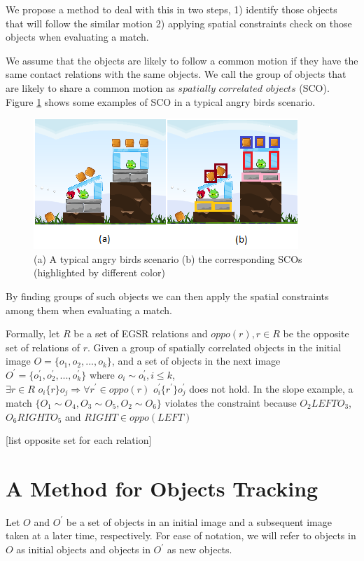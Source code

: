 \documentclass[letterpaper]{article}
\begin{document}
We propose a method to deal with this in two steps, 1) identify those objects that will follow the similar motion 2) applying spatial constraints check on those objects when evaluating a match. 


We assume that the objects are likely to follow a common motion if they have the same contact relations with the same objects. We call the group of objects that are likely to share a common motion as $spatially\,\,correlated\,\,objects$ (SCO). Figure \ref{SCOExample} shows some examples of SCO in a typical angry birds scenario. 
\begin{figure}[h!]\label{SCOExample}
\centering\includegraphics[scale=0.7]{SCOScenario.png}\caption{(a) A typical angry birds scenario (b) the corresponding SCOs (highlighted by different color)}
\end{figure}
By finding groups of such objects we can then apply the spatial constraints among them when evaluating a match. 

Formally, let $R$ be a set of EGSR relations and $oppo(r), r\in R$ be the opposite set of relations of $r$. Given a group of spatially correlated objects in the initial image $O = \{o_1, o_2, ... , o_k\}$, and a set of objects in the next image $O^\prime = \{o^{\prime}_1, o^{\prime}_2, ..., o^{\prime}_k \}$ where $o_i \sim o^{\prime}_i, i \leq k$, $\exists r\in R\,\, o_i \{r\} o_j \Rightarrow \forall r^{\prime} \in oppo(r)\,\, o^{\prime}_i \{r^{\prime}\} o^{\prime}_j $ does not hold. In the slope example, a match $\{O_1 \sim O_4, O_3 \sim O_5, O_2 \sim O_6\}$ violates the constraint because $O_2 LEFT O_3$, $O_6 RIGHT O_5$ and $RIGHT \in oppo(LEFT)$  

 [list opposite set for each relation]


\section{A Method for Objects Tracking}
Let $O$ and $O^{\prime}$ be a set of objects in an initial image and a subsequent image taken at a later time, respectively. For ease of notation, we will refer to objects in $O$ as initial objects and objects in $O^{\prime}$ as new objects.
\end{document}
